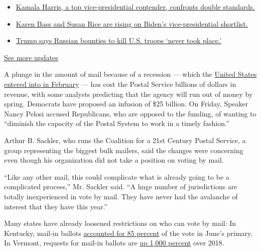 \begin{itemize}
\tightlist
\item
  \href{https://www.nytimes3xbfgragh.onion/2020/07/31/us/elections/biden-vs-trump.html?action=click\&pgtype=Article\&state=default\&region=MAIN_CONTENT_1\&context=storylines_live_updates\#link-29fdff45}{Kamala
  Harris, a top vice-presidential contender, confronts double
  standards.}
\item
  \href{https://www.nytimes3xbfgragh.onion/2020/07/31/us/elections/biden-vs-trump.html?action=click\&pgtype=Article\&state=default\&region=MAIN_CONTENT_1\&context=storylines_live_updates\#link-13ec3d9c}{Karen
  Bass and Susan Rice are rising on Biden's vice-presidential
  shortlist.}
\item
  \href{https://www.nytimes3xbfgragh.onion/2020/07/31/us/elections/biden-vs-trump.html?action=click\&pgtype=Article\&state=default\&region=MAIN_CONTENT_1\&context=storylines_live_updates\#link-49e9a016}{Trump
  says Russian bounties to kill U.S. troops `never took place.'}
\end{itemize}

\href{https://www.nytimes3xbfgragh.onion/2020/07/31/us/elections/biden-vs-trump.html?action=click\&pgtype=Article\&state=default\&region=MAIN_CONTENT_1\&context=storylines_live_updates}{See
more updates}

A plunge in the amount of mail because of a recession --- which the
\href{https://www.nytimes3xbfgragh.onion/2020/06/08/business/economy/us-economy-recession-2020.html}{United
States entered into in February} --- has cost the Postal Service
billions of dollars in revenue, with some analysts predicting that the
agency will run out of money by spring. Democrats have proposed an
infusion of \$25 billion. On Friday, Speaker Nancy Pelosi accused
Republicans, who are opposed to the funding, of wanting to ``diminish
the capacity of the Postal System to work in a timely fashion.''

Arthur B. Sackler, who runs the Coalition for a 21st Century Postal
Service, a group representing the biggest bulk mailers, said the changes
were concerning even though his organization did not take a position on
voting by mail.

``Like any other mail, this could complicate what is already going to be
a complicated process,'' Mr. Sackler said. ``A huge number of
jurisdictions are totally inexperienced in vote by mail. They have never
had the avalanche of interest that they have this year.''

Many states have already loosened restrictions on who can vote by mail:
In Kentucky, mail-in ballots
\href{https://www.whas11.com/article/news/local/kentucky-election-absentee-vote-turnout/417-23f2bb1e-ea9a-4c7e-8202-c33f54063ab6}{accounted
for 85 percent} of the vote in June's primary. In Vermont, requests for
mail-in ballots are
\href{https://www.sevendaysvt.com/OffMessage/archives/2020/07/03/absentee-ballot-requests-surge-in-vermont}{up
1,000 percent} over 2018.

